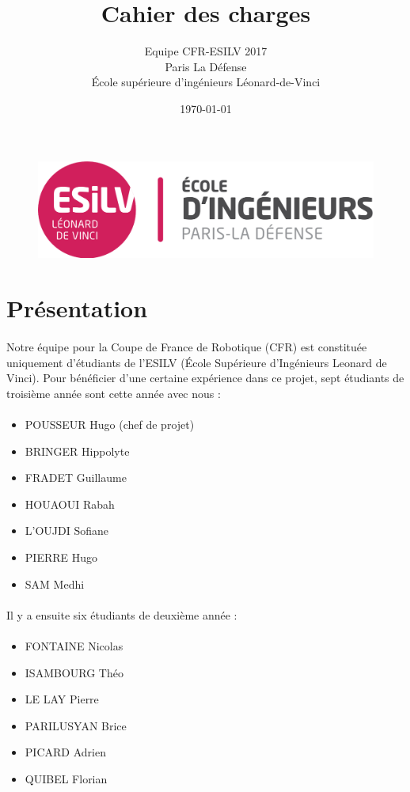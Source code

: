 \documentclass[12pt,a4paper]{article}
\title{Cahier des charges\\}
\author{Equipe CFR-ESILV 2017\\ [2em]
Paris La Défense\\[2em]
École supérieure d'ingénieurs Léonard-de-Vinci\\[1em]}
\date\today
\begin{document}
\maketitle

\begin{figure}[!h]
\centering
\includegraphics[width=5 cm]{img/Logo_ESILV.jpeg}
\end{figure}

\section{Présentation}

\paragraph{}
Notre équipe pour la Coupe de France de Robotique (CFR) est constituée uniquement d'étudiants de 
l'ESILV (École Supérieure d'Ingénieurs Leonard de Vinci).
Pour bénéficier d'une certaine expérience dans ce projet, sept étudiants de troisième année sont cette année avec nous : 
\paragraph{}
\begin{itemize}
\item POUSSEUR Hugo (chef de projet) 
\item BRINGER Hippolyte
\item FRADET Guillaume
\item HOUAOUI Rabah
\item L'OUJDI Sofiane
\item PIERRE Hugo
\item SAM Medhi 
\end{itemize}



\paragraph{}
Il y a ensuite six étudiants de deuxième année :  

\paragraph{}
\begin{itemize}
\item FONTAINE Nicolas 
\item ISAMBOURG Théo
\item LE LAY Pierre
\item PARILUSYAN Brice
\item PICARD Adrien
\item QUIBEL Florian
\end{itemize}
\end{document}

